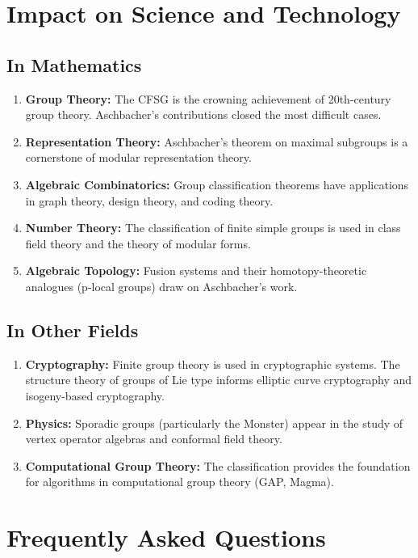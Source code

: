 \section{Impact on Science and Technology}

\subsection{In Mathematics}

\begin{enumerate}
    \item \textbf{Group Theory:} The CFSG is the crowning achievement of 20th-century group theory. Aschbacher's contributions closed the most difficult cases.
    \item \textbf{Representation Theory:} Aschbacher's theorem on maximal subgroups is a cornerstone of modular representation theory.
    \item \textbf{Algebraic Combinatorics:} Group classification theorems have applications in graph theory, design theory, and coding theory.
    \item \textbf{Number Theory:} The classification of finite simple groups is used in class field theory and the theory of modular forms.
    \item \textbf{Algebraic Topology:} Fusion systems and their homotopy-theoretic analogues (p-local groups) draw on Aschbacher's work.
\end{enumerate}

\subsection{In Other Fields}

\begin{enumerate}
    \item \textbf{Cryptography:} Finite group theory is used in cryptographic systems. The structure theory of groups of Lie type informs elliptic curve cryptography and isogeny-based cryptography.
    \item \textbf{Physics:} Sporadic groups (particularly the Monster) appear in the study of vertex operator algebras and conformal field theory.
    \item \textbf{Computational Group Theory:} The classification provides the foundation for algorithms in computational group theory (GAP, Magma).
\end{enumerate}

\section{Frequently Asked Questions}

